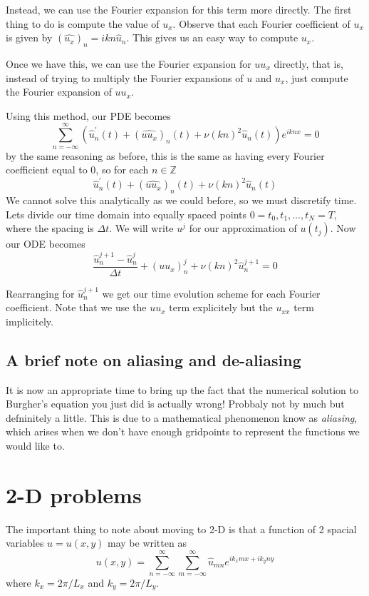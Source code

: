 \documentclass[a4paper,11pt]{article}
\theoremstyle{plain} %
\theoremstyle{remark}
\theoremstyle{definition} %
\begin{document}
Instead, we can use the Fourier expansion for this term more directly. The first thing to do is compute the value of $u_x$. Observe that each Fourier coefficient of $u_x$ is given by $(\widehat{u_x})_n=ikn\widehat{u}_n$. This gives us an easy way to compute $u_x$.

Once we have this, we can use the Fourier expansion for $uu_x$ directly, that is, instead of trying to multiply the Fourier expansions of $u$ and $u_x$, just compute the Fourier expansion of $uu_x$.

Using this method, our PDE becomes
\[
\sum_{n=-\infty}^\infty \left(\widehat{u}^\prime_n(t) +(\widehat{uu_x})_n(t)+\nu (kn)^2\widehat{u}_n(t) \right)e^{iknx}=0
\]
by the same reasoning as before, this is the same as having every Fourier coefficient equal to 0, so for each $n\in \mathbb{Z}$
\[
\widehat{u}^\prime_n(t) +(\widehat{uu_x})_n(t)+\nu (kn)^2\widehat{u}_n(t)
\]
We cannot solve this analytically as we could before, so we must discretify time. Lets divide our time domain into  equally spaced points $0=t_0,t_1,\dots,t_N=T$, where the spacing is $\Delta t$. We will write $u^{j}$ for our approximation of $u(t_j)$. Now our ODE becomes
\[
\frac{\widehat{u}_n^{j+1}-\widehat{u}_n^j}{\Delta t}+\left(uu_x\right)_n^j +\nu (kn)^2 \widehat{u}_n^{j+1}=0
\]

Rearranging for $\widehat{u}_n^{j+1}$ we get our time evolution scheme for each Fourier coefficient. Note that we use the $uu_x$ term explicitely but the $u_{xx}$ term implicitely.

\subsection{A brief note on aliasing and de-aliasing}
It is now an appropriate time to bring up the fact that the numerical solution to Burgher's equation you just did is actually wrong! Probbaly not by much but defninitely a little. This is due to a mathematical phenomenon know as \emph{aliasing}, which arises when we don't have enough gridpoints to represent the functions we would like to. 





\section{2-D problems}
The important thing to note about moving to 2-D is that a function of 2 spacial variables $u=u(x,y)$ may be written as 
\[
u(x,y)=\sum_{n=-\infty}^\infty \sum_{m=-\infty}^\infty \widehat{u}_{mn}e^{ik_x mx + ik_yny}
\]
where $k_x=2\pi/L_x$ and $k_y=2\pi/L_y$. 
\end{document}
